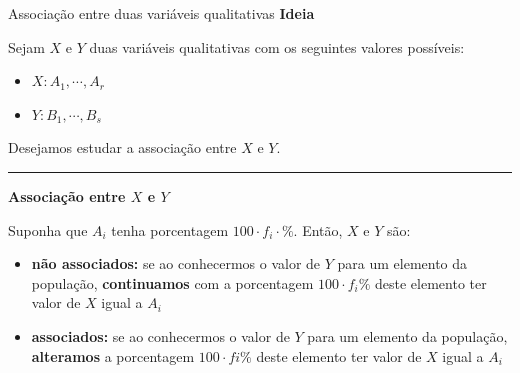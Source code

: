 \documentclass[
  10pt,
  ignorenonframetext,
]{beamer}
\providecommand{\tightlist}{%
  \setlength{\itemsep}{0pt}\setlength{\parskip}{0pt}}
\begin{document}
\begin{frame}{Associação entre duas variáveis qualitativas}
\protect\hypertarget{associauxe7uxe3o-entre-duas-variuxe1veis-qualitativas}{}
\textbf{Ideia}

Sejam \(X\) e \(Y\) duas variáveis qualitativas com os seguintes valores
possíveis:

\begin{itemize}
\tightlist
\item
  \(X: A_1, \cdots, A_r\)
\item
  \(Y: B_1, \cdots, B_s\)
\end{itemize}

Desejamos estudar a associação entre \(X\) e \(Y\).

\rule{\textwidth}{0.5pt}

\textbf{Associação entre \(X\) e \(Y\)}

Suponha que \(A_i\) tenha porcentagem \(100 \cdot f_i \cdot \%\). Então,
\(X\) e \(Y\) são:

\begin{itemize}
\tightlist
\item
  \textbf{não associados:} se ao conhecermos o valor de \(Y\) para um
  elemento da população, \textbf{continuamos} com a porcentagem
  \(100 \cdot f_i \%\) deste elemento ter valor de \(X\) igual a \(A_i\)
\item
  \textbf{associados:} se ao conhecermos o valor de \(Y\) para um
  elemento da população, \textbf{alteramos} a porcentagem
  \(100 \cdot fi \%\) deste elemento ter valor de \(X\) igual a \(A_i\)
\end{itemize}
\end{frame}
\end{document}
